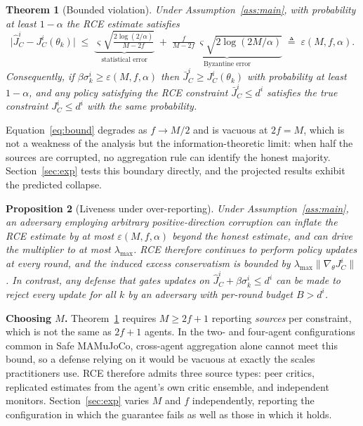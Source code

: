 \documentclass{article}
\newtheorem{theorem}{Theorem}
\newtheorem{proposition}[theorem]{Proposition}
\begin{document}
\begin{theorem}[Bounded violation]
\label{thm:bounded}
Under Assumption~\ref{ass:main}, with probability at least $1-\alpha$ the RCE estimate satisfies
\begin{equation}
\big|\hat{J}^i_C - J^i_C(\theta_k)\big| \;\le\; \underbrace{\varsigma\sqrt{\tfrac{2\log(2/\alpha)}{M-2f}}}_{\text{statistical error}} \;+\; \underbrace{\tfrac{f}{M-2f}\,\varsigma\sqrt{2\log(2M/\alpha)}}_{\text{Byzantine error}} \;\triangleq\; \varepsilon(M,f,\alpha).
\label{eq:bound}
\end{equation}
Consequently, if $\beta\sigma^i_k \ge \varepsilon(M,f,\alpha)$ then $\bar{J}^i_C \ge J^i_C(\theta_k)$ with probability at least $1-\alpha$, and any policy satisfying the RCE constraint $\bar{J}^i_C \le d^i$ satisfies the true constraint $J^i_C \le d^i$ with the same probability.
\end{theorem}

Equation~\eqref{eq:bound} degrades as $f \to M/2$ and is vacuous at $2f = M$, which is not a weakness of the analysis but the information-theoretic limit: when half the sources are corrupted, no aggregation rule can identify the honest majority. Section~\ref{sec:exp} tests this boundary directly, and the projected results exhibit the predicted collapse.

\begin{proposition}[Liveness under over-reporting]
\label{prop:liveness}
Under Assumption~\ref{ass:main}, an adversary employing arbitrary positive-direction corruption can inflate the RCE estimate by at most $\varepsilon(M,f,\alpha)$ beyond the honest estimate, and can drive the multiplier to at most $\lambda_{\max}$. RCE therefore continues to perform policy updates at every round, and the induced excess conservatism is bounded by $\lambda_{\max}\|\nabla_\theta J^i_C\|$. In contrast, any defense that gates updates on $\hat{J}^i_C + \beta\sigma^i_k \le d^i$ can be made to reject every update for all $k$ by an adversary with per-round budget $B > d^i$.
\end{proposition}

\textbf{Choosing $M$.} Theorem~\ref{thm:bounded} requires $M \ge 2f+1$ reporting \emph{sources} per constraint, which is not the same as $2f+1$ agents. In the two- and four-agent configurations common in Safe MAMuJoCo, cross-agent aggregation alone cannot meet this bound, so a defense relying on it would be vacuous at exactly the scales practitioners use. RCE therefore admits three source types: peer critics, replicated estimates from the agent's own critic ensemble, and independent monitors. Section~\ref{sec:exp} varies $M$ and $f$ independently, reporting the configuration in which the guarantee fails as well as those in which it holds.
\end{document}
